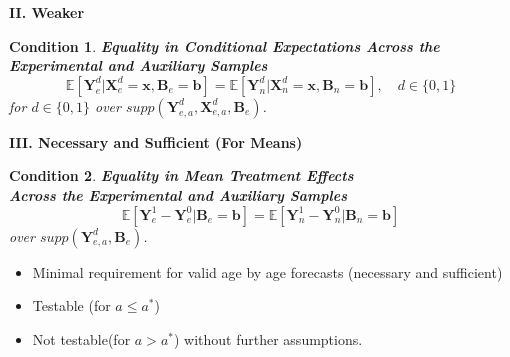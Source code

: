 \documentclass[static]{JJH-Beamer}
\newtheorem{condition}{Condition}
\begin{document}
\begin{frame}

\begin{center}
\textbf{II. Weaker}
\end{center}

\begin{condition} \textbf{Equality in Conditional Expectations Across the Experimental and Auxiliary Samples \label{cond:cond2}}
\begin{equation}
\mathbb{E} \left[ \bm{Y}_e^d |  \bm{X}_e^d = \bm{x}, \bm{B}_e = \bm{b} \right] = \mathbb{E} \left[ \bm{Y}_n^d |  \bm{X}_n^d = \bm{x}, \bm{B}_n = \bm{b} \right], \quad d \in \{0,1\}
\end{equation}
for $d \in \{0, 1 \}$ over $supp\left(\bm{Y}^d_{e,a}, \bm{X}^d_{e,a}, \bm{B}_e\right)$.
\end{condition}

\end{frame}


\begin{frame}

\begin{center}
\textbf{III. Necessary and Sufficient (For Means)}
\end{center}

\begin{condition} \textbf{Equality in Mean Treatment Effects \\Across the Experimental and Auxiliary Samples}\label{cond:cond3}
\begin{equation}
\mathbb{E} \left[ \bm{Y}_e^1 - \bm{Y}_e^0 | \bm{B}_e = \bm{b} \right] = \mathbb{E} \left[ \bm{Y}_n^1 - \bm{Y}_n^0 | \bm{B}_n = \bm{b} \right]
\end{equation}
over $supp\left(\bm{Y}^d_{e,a}, \bm{B}_e\right)$.
\end{condition}

\begin{itemize}
\item Minimal requirement for valid age by age forecasts (necessary and sufficient)
\item Testable (for $a\leq a^*$)
\item Not testable(for $a > a^*$) without further assumptions.
\end{itemize}

\end{frame}
\end{document}

